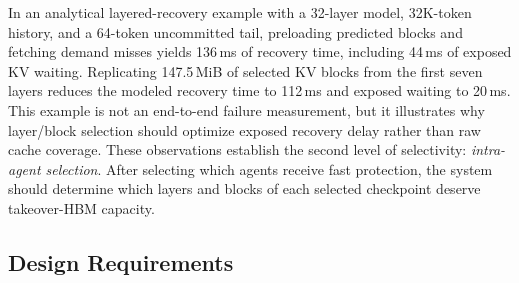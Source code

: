 In an analytical layered-recovery example with a 32-layer model, 32K-token history, and a 64-token uncommitted tail, preloading predicted blocks and fetching demand misses yields 136\,ms of recovery time, including 44\,ms of exposed KV waiting. Replicating 147.5\,MiB of selected KV blocks from the first seven layers reduces the modeled recovery time to 112\,ms and exposed waiting to 20\,ms. This example is not an end-to-end failure measurement, but it illustrates why layer/block selection should optimize exposed recovery delay rather than raw cache coverage. These observations establish the second level of selectivity: \emph{intra-agent selection}. After selecting which agents receive fast protection, the system should determine which layers and blocks of each selected checkpoint deserve takeover-HBM capacity. 

\subsection{Design Requirements} \label{sec:motivation:requirements} 

